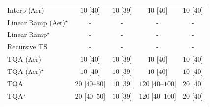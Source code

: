 \begin{tabular}{l|cccc|}
Interp (Aer) & {\cellcolor[HTML]{F7FCF5}} \color[HTML]{000000} $10$ [$40$] & {\cellcolor[HTML]{F7FCF5}} \color[HTML]{000000} $10$ [$39$] & {\cellcolor[HTML]{F7FCF5}} \color[HTML]{000000} $10$ [$40$] & {\cellcolor[HTML]{F7FCF5}} \color[HTML]{000000} $10$ [$40$] \\
Linear Ramp (Aer)$^\star$ & {\cellcolor[HTML]{000000}} \color[HTML]{F1F1F1} {\cellcolor{white}} \color{black} - & {\cellcolor[HTML]{000000}} \color[HTML]{F1F1F1} {\cellcolor{white}} \color{black} - & {\cellcolor[HTML]{000000}} \color[HTML]{F1F1F1} {\cellcolor{white}} \color{black} - & {\cellcolor[HTML]{000000}} \color[HTML]{F1F1F1} {\cellcolor{white}} \color{black} - \\
Linear Ramp$^\star$ & {\cellcolor[HTML]{000000}} \color[HTML]{F1F1F1} {\cellcolor{white}} \color{black} - & {\cellcolor[HTML]{000000}} \color[HTML]{F1F1F1} {\cellcolor{white}} \color{black} - & {\cellcolor[HTML]{000000}} \color[HTML]{F1F1F1} {\cellcolor{white}} \color{black} - & {\cellcolor[HTML]{000000}} \color[HTML]{F1F1F1} {\cellcolor{white}} \color{black} - \\
Recursive TS & {\cellcolor[HTML]{000000}} \color[HTML]{F1F1F1} {\cellcolor{white}} \color{black} - & {\cellcolor[HTML]{000000}} \color[HTML]{F1F1F1} {\cellcolor{white}} \color{black} - & {\cellcolor[HTML]{000000}} \color[HTML]{F1F1F1} {\cellcolor{white}} \color{black} - & {\cellcolor[HTML]{000000}} \color[HTML]{F1F1F1} {\cellcolor{white}} \color{black} - \\
TQA (Aer) & {\cellcolor[HTML]{F7FCF5}} \color[HTML]{000000} $10$ [$40$] & {\cellcolor[HTML]{F7FCF5}} \color[HTML]{000000} $10$ [$39$] & {\cellcolor[HTML]{F7FCF5}} \color[HTML]{000000} $10$ [$40$] & {\cellcolor[HTML]{F7FCF5}} \color[HTML]{000000} $10$ [$40$] \\
TQA (Aer)$^\star$ & {\cellcolor[HTML]{F7FCF5}} \color[HTML]{000000} $10$ [$40$] & {\cellcolor[HTML]{F7FCF5}} \color[HTML]{000000} $10$ [$39$] & {\cellcolor[HTML]{F7FCF5}} \color[HTML]{000000} $10$ [$40$] & {\cellcolor[HTML]{F7FCF5}} \color[HTML]{000000} $10$ [$40$] \\
TQA & {\cellcolor[HTML]{F5FBF3}} \color[HTML]{000000} $20$ [$40$--$50$] & {\cellcolor[HTML]{F7FCF5}} \color[HTML]{000000} $10$ [$39$] & {\cellcolor[HTML]{DCF2D7}} \color[HTML]{000000} $120$ [$40$--$100$] & {\cellcolor[HTML]{F5FBF3}} \color[HTML]{000000} $20$ [$40$] \\
TQA$^\star$ & {\cellcolor[HTML]{F5FBF3}} \color[HTML]{000000} $20$ [$40$--$50$] & {\cellcolor[HTML]{F7FCF5}} \color[HTML]{000000} $10$ [$39$] & {\cellcolor[HTML]{DCF2D7}} \color[HTML]{000000} $120$ [$40$--$100$] & {\cellcolor[HTML]{F5FBF3}} \color[HTML]{000000} $20$ [$40$] \\

\end{tabular}
